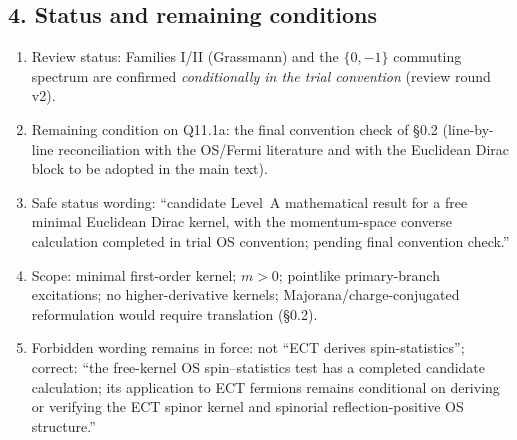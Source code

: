 \subsection*{4. Status and remaining conditions}
\begin{enumerate}[label=(\alph*)]
  \item Review status: Families I/II (Grassmann) and the
    $\{0,-1\}$ commuting spectrum are confirmed \emph{conditionally
    in the trial convention} (review round v2).
  \item Remaining condition on Q11.1a: the final convention check
    of \S0.2 (line-by-line reconciliation with the OS/Fermi
    literature and with the Euclidean Dirac block to be adopted in
    the main text).
  \item Safe status wording: ``candidate Level~A mathematical
    result for a free minimal Euclidean Dirac kernel, with the
    momentum-space converse calculation completed in trial OS
    convention; pending final convention check.''
  \item Scope: minimal first-order kernel; $m>0$; pointlike
    primary-branch excitations; no higher-derivative kernels;
    Majorana/charge-conjugated reformulation would require
    translation (\S0.2).
  \item Forbidden wording remains in force: not ``ECT derives
    spin-statistics''; correct: ``the free-kernel OS
    spin--statistics test has a completed candidate calculation;
    its application to ECT fermions remains conditional on
    deriving or verifying the ECT spinor kernel and spinorial
    reflection-positive OS structure.''
\end{enumerate}
